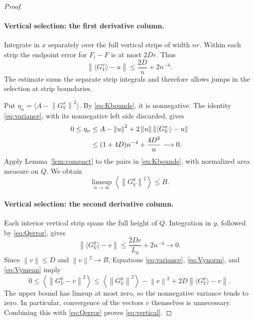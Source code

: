 \documentclass[11pt]{article}
\newcommand{\norm}[1]{\left\lVert#1\right\rVert}
\begin{document}
\begin{proof}
\paragraph{Vertical selection: the first derivative column.}
Integrate in $x$ separately over the full vertical strips of width $nr$. Within each strip the endpoint error for $F_i-F$ is at most $2Dr$. Thus
\begin{equation}\label{eq:Vxmean}
 \norm{\langle G_V^x\rangle-u}\le\frac{2D}{n}+2n^{-4}.
\end{equation}
The estimate sums the separate strip integrals and therefore allows jumps in the selection at strip boundaries.

Put $\eta_n=\langle A-\norm{G_V^x}^2\rangle$. By \eqref{eq:Kbounds}, it is nonnegative. The identity \eqref{eq:variance}, with its nonnegative left side discarded, gives
\begin{align}
 0\le\eta_n
 &\le A-\norm u^2+2\norm u\norm{\langle G_V^x\rangle-u}\notag\\
 &\le (1+4D)n^{-4}+\frac{4D^2}{n}\longrightarrow0.\label{eq:eta}
\end{align}
Apply Lemma~\ref{lem:compact} to the pairs in \eqref{eq:Kbounds}, with normalized area measure on $Q$. We obtain
\begin{equation}\label{eq:Vynorm}
 \limsup_{n\to\infty}\left\langle\norm{G_V^y}^2\right\rangle\le B.
\end{equation}

\paragraph{Vertical selection: the second derivative column.}
Each interior vertical strip spans the full height of $Q$. Integration in $y$, followed by \eqref{eq:Qerror}, gives
\begin{equation}\label{eq:Vymean}
 \norm{\langle G_V^y\rangle-v}\le\frac{2Dr}{L_y}+2n^{-4}\longrightarrow0.
\end{equation}
Since $\norm v\le D$ and $\norm v^2\to B$, Equations \eqref{eq:variance}, \eqref{eq:Vynorm}, and \eqref{eq:Vymean} imply
\[
 0\le\left\langle\norm{G_V^y-v}^2\right\rangle
 \le\left\langle\norm{G_V^y}^2\right\rangle-\norm v^2
       +2D\norm{\langle G_V^y\rangle-v}.
\]
The upper bound has limsup at most zero, so the nonnegative variance tends to zero. In particular, convergence of the vectors $v$ themselves is unnecessary. Combining this with \eqref{eq:Qerror} proves \eqref{eq:vertical}.
\end{proof}
\end{document}
